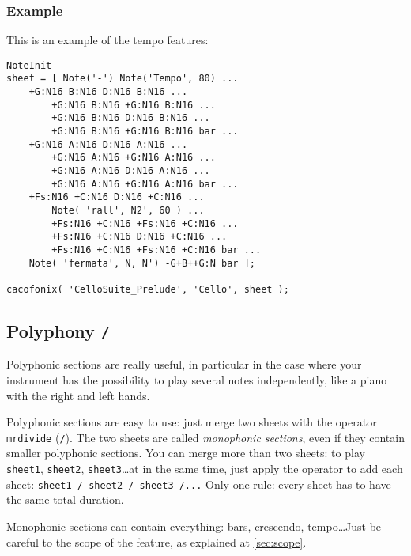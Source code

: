 \documentclass{article}
\begin{document}
\subsubsection{Example}

This is an example of the tempo features: \\

\begin{lstlisting}
NoteInit
sheet = [ Note('-') Note('Tempo', 80) ...
	+G:N16 B:N16 D:N16 B:N16 ...
		+G:N16 B:N16 +G:N16 B:N16 ...
		+G:N16 B:N16 D:N16 B:N16 ...
		+G:N16 B:N16 +G:N16 B:N16 bar ...
	+G:N16 A:N16 D:N16 A:N16 ...
		+G:N16 A:N16 +G:N16 A:N16 ...
		+G:N16 A:N16 D:N16 A:N16 ...
		+G:N16 A:N16 +G:N16 A:N16 bar ...
	+Fs:N16 +C:N16 D:N16 +C:N16 ...
		Note( 'rall', N2', 60 ) ...
		+Fs:N16 +C:N16 +Fs:N16 +C:N16 ...
		+Fs:N16 +C:N16 D:N16 +C:N16 ...
		+Fs:N16 +C:N16 +Fs:N16 +C:N16 bar ...
	Note( 'fermata', N, N') -G+B++G:N bar ];

cacofonix( 'CelloSuite_Prelude', 'Cello', sheet );
\end{lstlisting}

\subsection{Polyphony \lstinline!/!}
\label{sec:Polyphony}

Polyphonic sections are really useful, in particular in the case where your instrument has the possibility to play several notes independently, like a piano with the right and left hands.

Polyphonic sections are easy to use: just merge two sheets with the operator \lstinline!mrdivide! (\lstinline!/!). The two sheets are called \emph{monophonic sections}, even if they contain smaller polyphonic sections. You can merge more than two sheets: to play \lstinline!sheet1!, \lstinline!sheet2!, \lstinline!sheet3!\dots at in the same time, just apply the operator to add each sheet: \lstinline!sheet1 / sheet2 / sheet3 /...! Only one rule: every sheet has to have the same total duration.

Monophonic sections can contain everything: bars, crescendo, tempo\dots Just be careful to the scope of the feature, as explained at \ref{sec:scope}.
\end{document}
